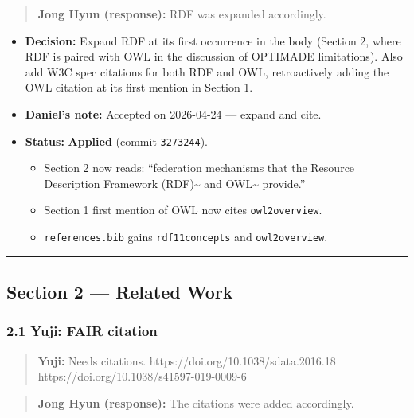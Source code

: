 \begin{quote}
\textbf{Jong Hyun (response):} RDF was expanded accordingly.
\end{quote}

\begin{itemize}
\tightlist
\item
  \textbf{Decision:} Expand RDF at its first occurrence in the body (Section 2, where RDF is paired with OWL in the discussion of OPTIMADE limitations). Also add W3C spec citations for both RDF and OWL, retroactively adding the OWL citation at its first mention in Section 1.
\item
  \textbf{Daniel's note:} Accepted on 2026-04-24 --- expand and cite.
\item
  \textbf{Status:} {\color{green!60!black}\faCheckCircle} \textbf{Applied} (commit \texttt{3273244}).

  \begin{itemize}
  \tightlist
  \item
    Section 2 now reads: ``federation mechanisms that the Resource Description Framework (RDF)\textasciitilde{}\cite{rdf11concepts} and OWL\textasciitilde{}\cite{owl2overview} provide.''
  \item
    Section 1 first mention of OWL now cites \texttt{owl2overview}.
  \item
    \texttt{references.bib} gains \texttt{rdf11concepts} and \texttt{owl2overview}.
  \end{itemize}
\end{itemize}

\begin{center}\rule{0.5\linewidth}{0.5pt}\end{center}

\subsection{Section 2 --- Related Work}\label{section-2-related-work}

\subsubsection{2.1 Yuji: FAIR citation}\label{yuji-fair-citation}

\begin{quote}
\textbf{Yuji:} Needs citations. https://doi.org/10.1038/sdata.2016.18 https://doi.org/10.1038/s41597-019-0009-6
\end{quote}

\begin{quote}
\textbf{Jong Hyun (response):} The citations were added accordingly.
\end{quote}


